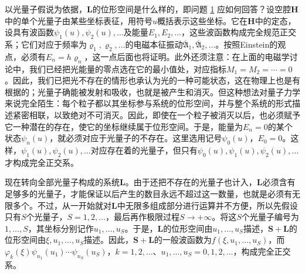 \documentclass[fontsize=13pt,twoside,openany,headings=normal,parskip=false,bookmarkpackage=false,DIV=calc]{scrbook}
\begin{document}
以光量子假说为依据，$\boldsymbol{L}$的位形空间是什么样的，即问题 \hyperref[problem:III.6.1]{1} 应如何回答？设空腔$\boldsymbol H$中的单个光量子由某些坐标表征，用符号$u$概括表示这些坐标。它在$\boldsymbol H$中的定态，设具有波函数$\psi_1(u),\allowbreak \psi_2(u),\allowbreak \ldots$及能量$E_1,\allowbreak E_2,\allowbreak \ldots$，这些波函数构成完全规范正交系；它们对应于频率为$\varrho_1,\allowbreak \varrho_2,\allowbreak \ldots$的电磁本征振动$\overline{\mathfrak A}_1,\allowbreak \overline{\mathfrak A}_2,\allowbreak \ldots$。按照Einstein的观点，必须有$E_n=h\varrho_n$，这一点后面也将证明。此外还须注意：在上面的电磁学讨论中，我们已经把光能量的零点选在它的最小值处，对应指标$M_1=M_2=\cdots=0$。因此，我们已把光不存在的情形也承认为光的一种可能状态，这在物理上也是有根据的；光量子确能被发射和吸收，也就是被产生和消灭。但这种想法对量子力学来说完全陌生：每个粒子都以其坐标参与系统的位形空间，并与整个系统的形式描述紧密相联，以致绝对不可消灭。因此，即使在一个粒子被消灭以后，也必须赋予它一种潜在的存在，使它的坐标继续属于位形空间。于是，能量为$E_n=0$的某个状态$\psi_n(u)$，就必须对应于光量子的不存在。这里选用记号$\psi_0(u)$，$E_0=0$。这样，$\psi_1(u),\allowbreak \psi_2(u),\allowbreak \ldots$对应存在着的光量子，\hypertarget{origpage-146}{}\label{origpage-146}但只有$\psi_0(u),\allowbreak \psi_1(u),\allowbreak \psi_2(u),\allowbreak \ldots$才构成完全正交系。

现在转向全部光量子构成的系统$\boldsymbol{L}$。由于还把不存在的光量子也计入，$\boldsymbol{L}$必须含有足够多的光量子，才能保证以后产生的数目永远不超过这一数量，也就是必须有无限多个。不过，从一开始就对$\boldsymbol{L}$中无限多组成部分进行运算并不方便，所以先假设只有$S$个光量子，$S=1,\allowbreak 2,\allowbreak \ldots$，最后再作极限过程$S\longrightarrow+\infty$。将这$S$个光量子编号为$1,\allowbreak \ldots,\allowbreak S$，其坐标分别记作$u_1,\allowbreak \ldots,\allowbreak u_S$。于是，$\boldsymbol{L}$的位形空间由$u_1,\allowbreak \ldots,\allowbreak u_S$描述，$\boldsymbol{S}+\boldsymbol{L}$的位形空间由$\xi,\allowbreak u_1,\allowbreak \ldots,\allowbreak u_S$描述。因此，$\boldsymbol{S}+\boldsymbol{L}$的一般波函数为$f(\xi,\allowbreak u_1,\allowbreak \ldots,\allowbreak u_S)$，而$\varphi_k(\xi)\allowbreak \psi_{n_1}(u_1)\cdots\psi_{n_S}(u_S)$，$k=1,\allowbreak 2,\allowbreak \ldots$、$u_1,\allowbreak \ldots,\allowbreak u_S=0,\allowbreak 1,\allowbreak 2,\allowbreak \ldots$，构成完全正交系。
\end{document}
